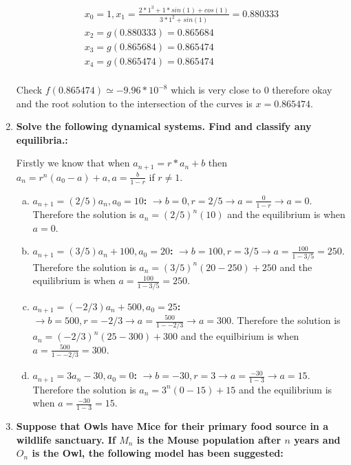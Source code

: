 \documentclass{article}
\begin{document}
\begin{enumerate}[1.]
\begin{gather*}
x_0 = 1, x_1 = \frac{2* 1^3 + 1 * sin(1) + cos(1)}{3 * 1^2 + sin(1)} = 0.880333 \\
x_2 = g(0.880333) = 0.865684 \\
x_3 = g(0.865684) = 0.865474 \\
x_4 = g(0.865474) = 0.865474 \\
\end{gather*}

Check $f(0.865474) \simeq -9.96 * 10^{-8}$ which is very close to 0 therefore okay and the root solution to the intersection of the curves is $x = 0.865474$.

\item
\textbf{Solve the following dynamical systems. Find and classify any equilibria.:}

Firstly we know that when $a_{n+1} = r*a_n + b$ then $a_n = r^n(a_0 - a) + a, a = \frac{b}{1-r}$ if $r \neq 1$.

\begin{enumerate}[(a)]
  \item \textbf{$a_{n+1} = (2/5)a_n, a_0 = 10$:} 
$\to b = 0, r=2/5 \to a = \frac{0}{1 - r} \to a = 0$. Therefore the solution is $a_n = (2/5)^n(10)$ and the equilibrium is when $a = 0$.

  \item \textbf{$a_{n+1} = (3/5)a_n + 100, a_0 = 20$:}
$\to b = 100, r = 3/5 \to a = \frac{100}{1 - 3/5} = 250$. Therefore the solution is $a_n = (3/5)^n(20 - 250) + 250$ and the equilibrium is when $a = \frac{100}{1 - 3/5} = 250$.

  \item \textbf{$a_{n+1} = (-2/3)a_n + 500, a_0 = 25$:} 
$\to b = 500, r=-2/3 \to a = \frac{500}{1 - -2/3} \to a = 300$. 
Therefore the solution is $a_n = (-2/3)^n(25 - 300) + 300$ and the equilbirium is when $a = \frac{500}{1 - -2/3} = 300$.

  \item \textbf{$a_{n+1} = 3a_n - 30, a_0 = 0$:} 
$\to b = -30, r=3 \to a = \frac{-30}{1 - 3} \to a = 15$. Therefore the solution is $a_n = 3^n(0 - 15) + 15$ and the equilibrium is when $a = \frac{-30}{1-3} = 15$.
\end{enumerate}

\item 
\textbf{Suppose that Owls have Mice for their primary food source in a wildlife sanctuary. If $M_n$ is the Mouse population after $n$ years and $O_n$ is the Owl, the following model has been suggested:}


\end{enumerate}
\end{document}
